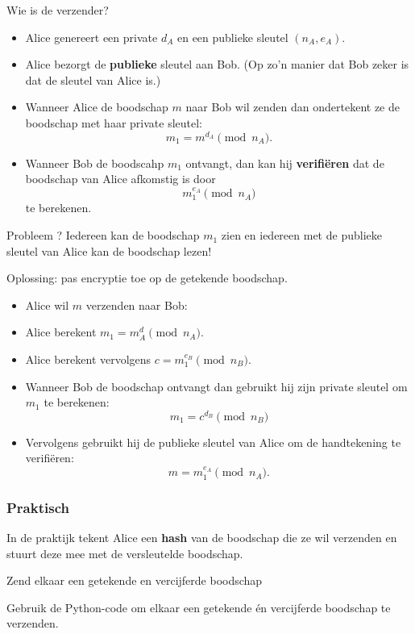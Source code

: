 \documentclass{beamer}
\begin{document}
\begin{frame}{Wie is de verzender?}
\begin{itemize}
	\item Alice genereert een private $d_A$ en een publieke sleutel $(n_A, e_A)$. 
	\pause\item  Alice bezorgt de \textbf{publieke} sleutel aan Bob. (Op zo'n manier
	dat Bob zeker is dat de sleutel van Alice is.)
	\pause \item Wanneer Alice de boodschap $m$ naar Bob wil zenden dan
	  	ondertekent ze de boodschap met haar private sleutel:
	  	\[
	  	m_1 = m^{d_A} \pmod{n_A}.
	  	\]
	\pause \item Wanneer Bob de boodscahp $m_1$ ontvangt, dan kan hij 
	\textbf{verifi\"eren} dat de boodschap van Alice afkomstig is 
	door 
	\[
	m_1^{e_A} \pmod{n_A}
	\]
	te berekenen.
\end{itemize}
\end{frame}

\begin{frame}{Probleem ?}
\pause Iedereen kan de boodschap $m_1$ zien en iedereen met de publieke 
sleutel van Alice kan de boodschap lezen!

\vspace{0.5cm}
\pause Oplossing: pas encryptie toe op de getekende boodschap.
\begin{itemize}
	\item Alice wil $m$ verzenden naar Bob:
	\item Alice berekent $m_1 = m^d_A \pmod{n_A}$.
	\item Alice berekent vervolgens $c = m_1^{e_B} \pmod{n_B}$.
	\item Wanneer Bob de boodschap ontvangt dan gebruikt hij zijn private sleutel om $m_1$
	te berekenen:
	\[
	m_1 = c^{d_B} \pmod{n_B}
	\]
	\item Vervolgens gebruikt hij de publieke sleutel van Alice om de handtekening te verifi\"eren:
	\[
	m = m_1^{e_A} \pmod{n_A}.
	\]
\end{itemize}
\end{frame}

\begin{frame}
\frametitle{Praktisch}
In de praktijk tekent Alice een \textbf{hash} van de boodschap die ze wil verzenden 
en stuurt deze mee met de versleutelde boodschap.
\end{frame}


\begin{frame}{Zend elkaar een getekende en vercijferde boodschap}

Gebruik de Python-code om elkaar een getekende \'en vercijferde boodschap te verzenden.
\end{frame}





\end{document}
